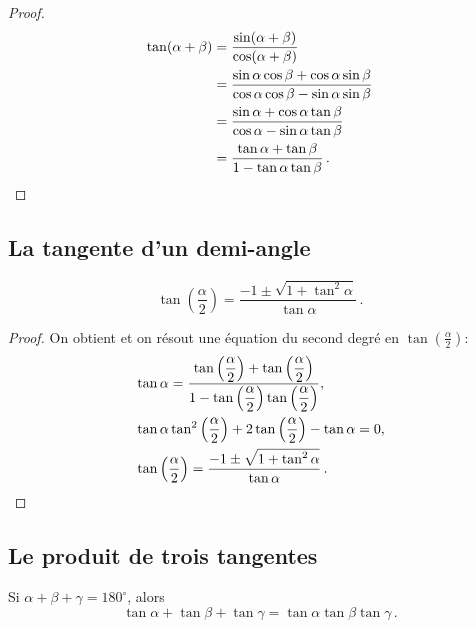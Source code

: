 \begin{proof}
\begin{align*}
\tan (\alpha+\beta) &= \frac{\sin(\alpha+\beta)}{\cos(\alpha+\beta)}\\
&=\frac{\sin\alpha\cos\beta+\cos\alpha\sin\beta}{\cos\alpha\cos\beta-\sin\alpha\sin\beta}\\
&=\frac{\sin\alpha+\cos\alpha\tan\beta}{\cos\alpha-\sin\alpha\tan\beta}\\
&=\frac{\tan\alpha+\tan\beta}{1-\tan\alpha\tan\beta}\,.\qedhere
\end{align*}
\end{proof}


\subsection{La tangente d'un demi-angle}\label{s.tangent-half}

\begin{theorem}\label{thm.tangent-half}
\[
\tan\left(\frac{\alpha}{2}\right) = \frac{-1\pm\sqrt{1+\tan^2\alpha}}{\tan\alpha}\,.
\]
\end{theorem}
\begin{proof}
On obtient et on résout une équation du second degré en 
$\displaystyle\tan\left(\displaystyle\frac{\alpha}{2}\right)$:
\begin{align*}
&\tan \alpha=\displaystyle\frac{
  \tan\left(\displaystyle\frac{\alpha}{2}\right)+
  \tan\left(\displaystyle\frac{\alpha}{2}\right)
  }{
  1-\tan\left(\displaystyle\frac{\alpha}{2}\right)
    \tan\left(\displaystyle\frac{\alpha}{2}\right)
  },\\
&\tan\alpha \tan^2  \left(\displaystyle\frac{\alpha}{2}\right) + 2 \tan \left(\displaystyle\frac{\alpha}{2}\right) -\tan\alpha =0,\\
&\tan\left(\displaystyle\frac{\alpha}{2}\right) = \displaystyle\frac{-1\pm\sqrt{1+\tan^2\alpha}}{\tan\alpha}\,.\qedhere
\end{align*}
\end{proof}



\subsection{Le produit de trois tangentes}\label{s.tangent-three}

\begin{theorem}\label{thm.tangent3}
Si $\alpha+\beta+\gamma=180^\circ$, alors
\[
\tan\alpha+\tan\beta+\tan\gamma = \tan\alpha\tan\beta\tan\gamma\,.
\]
\end{theorem}

